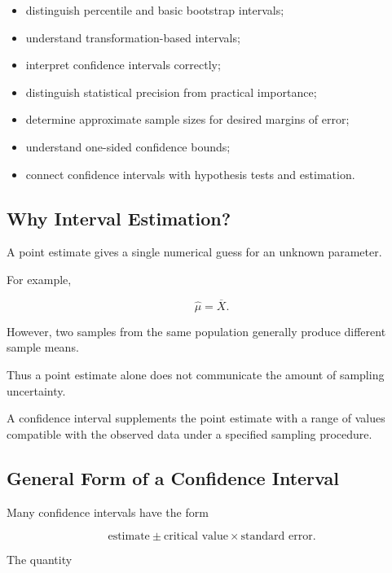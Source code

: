 {\begin{itemize}
    \item distinguish percentile and basic bootstrap intervals;
    \item understand transformation-based intervals;
    \item interpret confidence intervals correctly;
    \item distinguish statistical precision from practical importance;
    \item determine approximate sample sizes for desired margins of error;
    \item understand one-sided confidence bounds;
    \item connect confidence intervals with hypothesis tests and
          estimation.
\end{itemize}
}

\subsection{Why Interval Estimation?}
\label{subsec:why-interval-estimation}

A point estimate gives a single numerical guess for an unknown
parameter.

For example,

\[
\widehat{\mu}
=
\overline{X}.
\]

However, two samples from the same population generally produce
different sample means.

Thus a point estimate alone does not communicate the amount of sampling
uncertainty.

A confidence interval supplements the point estimate with a range of
values compatible with the observed data under a specified sampling
procedure.

\subsection{General Form of a Confidence Interval}
\label{subsec:general-confidence-interval}

Many confidence intervals have the form

\[
\boxed{
\text{estimate}
\pm
\text{critical value}
\times
\text{standard error}.
}
\]

The quantity

